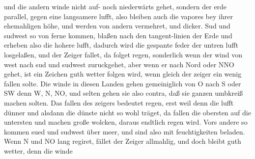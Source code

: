 und die andern winde%
nicht auf- noch niederwärts gehet,
sondern der erde parallel,%
gegen eine langsamere lufft,%
also bleiben auch die vapores%
bey ihrer ehemahligen höhe,
und werden von andern vermehret,
und dicker.%
\pend%
\pstart%
Sud und sudwest%
%
so von ferne kommen,
blaßen nach den tangent-linien%
der Erde%
und erheben also die hohere lufft,%
dadurch wird die gespante feder%
%
der untren
lufft%
losgelaßen, %
und der Zeiger fallet,%
%
da folget regen,%
sonderlich %
wenn der wind%
von west %
nach sud und sudwest zuruckgehet,
aber wenn er
nach Nord oder NNO gehet,
ist ein Zeichen%
%
guth wetter%
folgen wird,
wenn gleich der zeiger%
%
ein wenig fallen solte.
Die winde%
in diesen Landen%
gehen gemeiniglich
von O nach S oder SW
denn W, N, NO,
und
selten gehen sie also contra,
daß sie
ganzen umbkreiß%
machen solten.%
\pend%
\pstart%
%
Das fallen des zeigers%
%
bedeutet regen,%
erst weil denn die lufft dünner%
und alsdann die dünste%
nicht so wohl träget,
da fallen die obersten auf die untersten
und machen große wolcken,%
daraus endtlich regen wird.%
%
Vors andere so kommen sued und sudwest%
%
über meer,%
und sind also mit feuchtigkeiten beladen.%
%
\pend%
\pstart%
Wenn N und NO lang regiret,%
%
fället der Zeiger allmahlig,%
%
und doch bleibt guth wetter,%
denn die winde%
